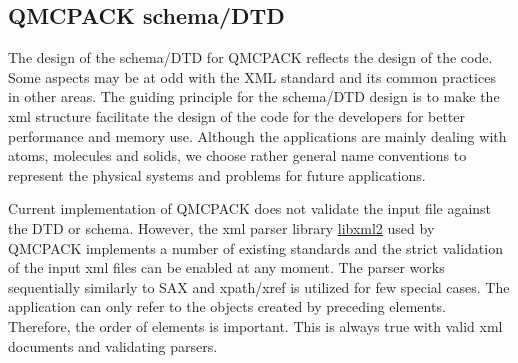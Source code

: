 \subsection{QMCPACK schema/DTD} \label{schema.sec}

The design of the schema/DTD for QMCPACK reflects the design of the code.  Some
aspects may be at odd with the XML standard and its common practices in other
areas. The guiding principle for the schema/DTD design is to make the xml
structure facilitate the design of the code for the developers for better
performance and memory use.  Although the applications are mainly dealing with
atoms, molecules and solids, we choose rather general name conventions to
represent the physical systems and problems for future applications. 


Current implementation of QMCPACK does not validate the input file against the
DTD or schema. However, the xml parser library
\href{http://xmlsoft.org}{libxml2} used by QMCPACK implements a number of
existing standards and the strict validation of the input xml files can be
enabled at any moment. The parser works sequentially similarly to SAX and
xpath/xref is utilized for few special cases. The application can only refer to
the objects created by preceding elements. Therefore, the order of elements is
important.  This is always true with valid xml documents and validating
parsers.

